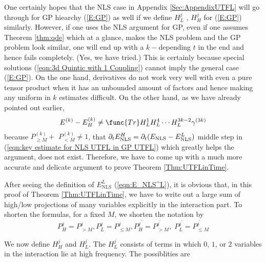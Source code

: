 \documentclass[12pt,letterpaper,leqno]{amsart}
\theoremstyle{plain}
\numberwithin{equation}{section}
\numberwithin{theorem}{section}
\numberwithin{proposition}{section}
\numberwithin{lemma}{section}
\numberwithin{corollary}{section}
\begin{document}
One certainly hopes that the NLS case in Appendix \ref{Sec:AppendixUTFL}
will go through for GP hiearchy (\ref{E:GP}) as well if we define $H_{L}^{j}$%
, $H_{H}^{j}$ for (\ref{E:GP}) similarly. However, if one uses the NLS
argument for GP, even if one assumes Theorem \ref{thm:qde} which at a
glance, makes the NLS problem and the GP problem look similar, one will end
up with a $k-$depending $t$ in the end and hence fails completely. (Yes, we
have tried.) This is certainly because special solutions (\ref{eqn:3d
Quintic with 1 Coupling}) cannot imply the general case (\ref{E:GP}). On the
one hand, derivatives do not work very well with even a pure tensor product
when it has an unbounded amount of factors and hence making any uniform in $%
k $ estimates difficult. On the other hand, as we have already pointed out
earlier, 
\begin{equation*}
E^{(k)}-E_{H}^{(k)}\neq \func{Tr}H_{L}^{1}H_{L}^{4}\cdots H_{L}^{3k-2}\gamma
^{(3k)}
\end{equation*}%
because $P_{\geqslant M}^{(k)}+$ $P_{<M}^{(k)}\neq 1$, that $\partial _{t}E_{%
\text{NLS}}^{H}=\partial _{t}(E_{\text{NLS}}-E_{\text{NLS}}^{L})$ middle
step in (\ref{eqn:key estimate for NLS UTFL in GP UTFL}) which greatly helps
the argument, does not exist. Therefore, we have to come up with a much more
accurate and delicate argument to prove Theorem \ref{Thm:UTFLinTime}.

After seeing the definition of $E_{\text{NLS}}^{L}$ (\ref{eqn:E_NLS^L}), it
is obvious that, in this proof of Theorem \ref{Thm:UTFLinTime}, we have to
write out a large sum of high/low projections of many variables explicitly
in the interaction part. To shorten the formulas, for a fixed $M$, we
shorten the notation by 
\begin{equation*}
P_{H}^{j}=P_{>M}^{j},P_{L}^{j}=P_{\leqslant M}^{j},P_{H}^{j^{\prime
}}=P_{>M}^{j^{\prime }},\;P_{L}^{j^{\prime }}=P_{\leqslant M}^{j^{\prime }}
\end{equation*}

We now define $H_{H}^{j}$ and $H_{L}^{j}$. The $H_{L}^{j}$ consists of terms
in which $0$, $1$, or $2$ variables in the interaction lie at high
frequency. The possiblities are
\end{document}
